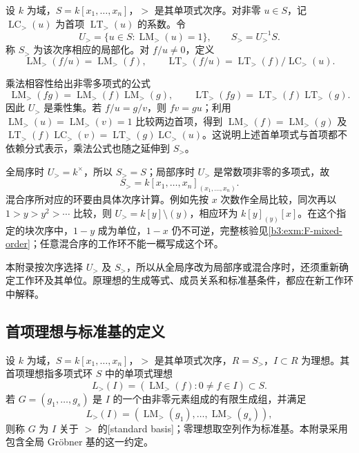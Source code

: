 \begin{definition}\label{b3:def:F-order-localization}
	设 \(k\) 为域，\(S=k[x_1,\ldots,x_n]\)，\(>\) 是其单项式次序。对非零 \(u\in S\)，记 \(\operatorname{LC}_{>}(u)\) 为首项 \(\operatorname{LT}_{>}(u)\) 的系数。令
	\[
		U_{>}=\{u\in S:\operatorname{LM}_{>}(u)=1\}, \qquad S_{>}=U_{>}^{-1}S.
	\]
	称 \(S_{>}\) 为该次序相应的局部化。对 \(f/u\ne0\)，定义
	\[
		\operatorname{LM}_{>}(f/u)=\operatorname{LM}_{>}(f), \qquad \operatorname{LT}_{>}(f/u) =\operatorname{LT}_{>}(f)/\operatorname{LC}_{>}(u).
	\]
\end{definition}

乘法相容性给出非零多项式的公式
\[
	\operatorname{LM}_{>}(fg) =\operatorname{LM}_{>}(f)\operatorname{LM}_{>}(g), \qquad \operatorname{LT}_{>}(fg) =\operatorname{LT}_{>}(f)\operatorname{LT}_{>}(g).
\]
因此 \(U_{>}\) 是乘性集。若 \(f/u=g/v\)，则 \(fv=gu\)；利用 \(\operatorname{LM}_{>}(u)=\operatorname{LM}_{>}(v)=1\) 比较两边首项，得到 \(\operatorname{LM}_{>}(f)=\operatorname{LM}_{>}(g)\) 及 \(\operatorname{LT}_{>}(f)\operatorname{LC}_{>}(v)=\operatorname{LT}_{>}(g)\operatorname{LC}_{>}(u)\)。这说明上述首单项式与首项都不依赖分式表示，乘法公式也随之延伸到 \(S_{>}\)。

\ProseParagraphBreak
全局序时 \(U_{>}=k^\times\)，所以 \(S_{>}=S\)；局部序时 \(U_{>}\) 是常数项非零的多项式，故
\[
	S_{>}=k[x_1,\ldots,x_n]_{(x_1,\ldots,x_n)}.
\]
混合序所对应的环要由具体次序计算。例如先按 \(x\) 次数作全局比较，同次再以 \(1>y>y^2>\cdots\) 比较，则 \(U_{>}=k[y]\setminus(y)\)，相应环为 \(k[y]_{(y)}[x]\)。在这个指定的块次序中，\(1-y\) 成为单位，\(1-x\) 仍不可逆，完整核验见\cref{b3:exm:F-mixed-order}；任意混合序的工作环不能一概写成这个环。

\ProseParagraphBreak
本附录按次序选择 \(U_{>}\) 及 \(S_{>}\)，所以从全局序改为局部序或混合序时，还须重新确定工作环及其单位。原理想的生成等式、成员关系和标准基条件，都应在新工作环中解释。

\subsection{首项理想与标准基的定义}
\label{b3:subsec:F01:02}

\begin{definition}\label{b3:def:F-standard-basis}
	设 \(k\) 为域，\(S=k[x_1,\ldots,x_n]\)，\(>\) 是其单项式次序，\(R=S_{>}\)，\(I\subset R\) 为理想。其首项理想指多项式环 \(S\) 中的单项式理想
	\[
		L_{>}(I)=(\operatorname{LM}_{>}(f):0\ne f\in I)\subset S.
	\]
	若 \(G=(g_1,\ldots,g_s)\) 是 \(I\) 的一个由非零元素组成的有限生成组，并满足
	\[
		L_{>}(I)=(\operatorname{LM}_{>}(g_1),\ldots, \operatorname{LM}_{>}(g_s)),
	\]
	则称 \(G\) 为 \(I\) 关于 \(>\) 的[standard basis]；零理想取空列作为标准基。本附录采用包含全局 Gröbner 基的这一约定。
\end{definition}

